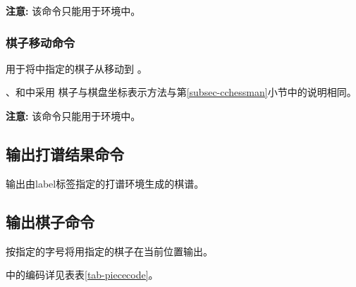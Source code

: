 \documentclass[full]{l3doc}
\begin{document}
\begin{documentation}
  \textbf{\textsf{注意: }}该命令只能用于环境中。

\subsubsection{棋子移动命令}

\begin{function}{\mov}
  \begin{syntax}
     
  \end{syntax}
\end{function}

  用于将中指定的棋子从移动到%
  。

  、和中采用
  棋子与棋盘坐标表示方法与第\ref{subsec-cchessman}小节中的说明相同。

  \textbf{\textsf{注意: }}该命令只能用于环境中。

\subsection{输出打谱结果命令}

\begin{function}{\printman}
  \begin{syntax}
     
  \end{syntax}
\end{function}

  输出由label标签指定的打谱环境生成的棋谱。

\subsection{输出棋子命令}

\begin{function}{\getpiece}
  \begin{syntax}
      
  \end{syntax}
\end{function}

  按指定的字号将用指定的棋子在当前位置输出。

  中的编码详见表表\ref{tab-piececode}。

\begin{SideBySideExample}[frame=single,numbers=left,
                xrightmargin=.28\linewidth,gobble=2]
  \centering


\end{SideBySideExample}
\end{documentation}
\end{document}
